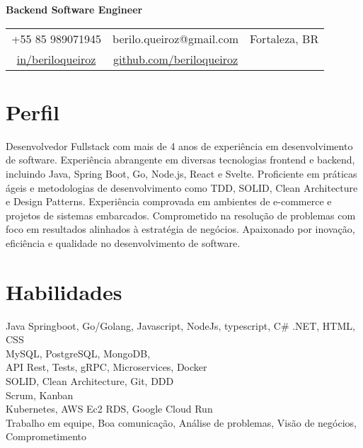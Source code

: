\documentclass[11pt,a4paper,sans]{moderncv}
\begin{document}
\makecvtitle
\vspace*{-16mm}
\begin{center}\textbf{ Backend Software Engineer}\end{center}
\begin{center}
	\begin{tabular}{ c c c }
		\faMobile\enspace +55 85 989071945                                                                  & \enspace berilo.queiroz@gmail.com & \enspace\faHome\enspace Fortaleza, BR \\
		\faLinkedin\enspace \color{blue} \href{https://www.linkedin.com/in/beriloqueiroz}{in/beriloqueiroz} &
		\faGithub\enspace \color{blue} \href{https://github.com/beriloqueiroz}{github.com/beriloqueiroz}    & \enspace
	\end{tabular}
\end{center}

\section{Perfil}
 {
  Desenvolvedor Fullstack com mais de 4 anos de experiência em desenvolvimento de software. Experiência abrangente em diversas tecnologias frontend e backend, incluindo Java, Spring Boot, Go, Node.js, React e Svelte. Proficiente em práticas ágeis e metodologias de desenvolvimento como TDD, SOLID, Clean Architecture e Design Patterns. Experiência comprovada em ambientes de e-commerce e projetos de sistemas embarcados. Comprometido na resolução de problemas com foco em resultados alinhados à estratégia de negócios. Apaixonado por inovação, eficiência e qualidade no desenvolvimento de software.
 }

\section{Habilidades}
 {
  Java Springboot, Go/Golang, Javascript, NodeJs, typescript, C\# .NET, HTML, CSS \\
  MySQL, PostgreSQL, MongoDB, \\
  API Rest, Tests, gRPC, Microservices, Docker\\
  SOLID, Clean Architecture, Git, DDD \\
  Scrum, Kanban\\
  Kubernetes, AWS Ec2 RDS, Google Cloud Run\\
  Trabalho em equipe, Boa comunicação, Análise de problemas, Visão de negócios, Comprometimento\\
 }
\end{document}
